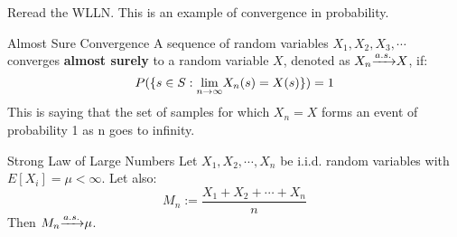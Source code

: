 \begin{exmp}{}{}
Reread the WLLN. This is an example of convergence in probability.
\end{exmp}

\begin{thm}{Almost Sure Convergence}{}
A sequence of random variables \(X_1, X_2, X_3, \cdots\) converges \textbf{almost surely} to a random variable \(X\), denoted as \(X_n {\xrightarrow{a.s.}} X\), if:
\begin{equation*}
  P(\{s \in S : {\lim_{n \to \infty}} X_n(s) = X(s)\}) = 1
\end{equation*}
This is saying that the set of samples for which \(X_n = X\) forms an event of probability 1 as n goes to infinity.
\end{thm}
\begin{thm}{Strong Law of Large Numbers}{}
Let \(X_1,X_2,\cdots,X_n\) be i.i.d. random variables with \(E[X_i] = \mu < \infty\). Let also:
\begin{equation*}
  M_n := \frac{X_1 + X_2 + \cdots + X_n}{n}
\end{equation*}
Then \(M_n {\xrightarrow{a.s.}} \mu\).
\end{thm}






